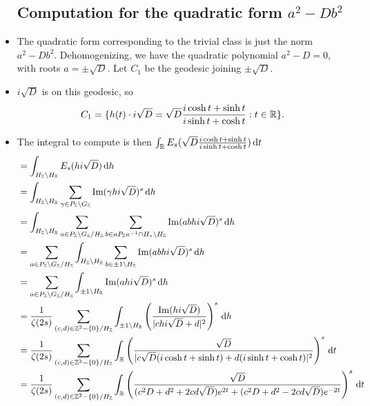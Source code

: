 \documentclass[11pt]{amsart}
\newcommand{\sm}{\setminus}
\begin{document}
\begin{itemize}
	\subsection{Computation for the quadratic form $a^{2}-Db^{2}$}
		\item The quadratic form corresponding to the trivial class is just the norm $a^{2}-Db^{2}$. Dehomogenizing, we have the quadratic polynomial $a^{2}-D=0$, with roots $a=\pm \sqrt{D}$. Let $C_{1}$ be the geodesic joining $\pm \sqrt{D}$.
		\item $i\sqrt{D}$ is on this geodesic, so
			\begin{align*}
				C_{1}= \{ h(t)\cdot i\sqrt{D} = \sqrt{D}\frac{i \cosh t+ \sinh t}{i \sinh t+\cosh t}: t\in \mathbb{R}\}. 
			\end{align*} 
		\item The integral to compute is then $\int_{\mathbb{R}} E_{s}(\sqrt{D}\frac{i \cosh t+ \sinh t}{i \sinh t+\cosh t}) \,{\rm d} t $
			\begin{align*}
																	&= \int_{H_{\Z}\sm H_{\R}} E_{s}(h  i \sqrt{D}) \dop h \\
																	&= \int_{H_{\Z}\sm H_{\R}} \sum_{\gamma \in P_{\Z}\sm G_{\Z}}\im(\gamma h i \sqrt{D})^{s}\dop h \\
																	&= \int_{H_{\Z}\sm H_{\R}} \sum_{a \in P_{\Z}\sm G_{\Z}/H_{\Z}} \sum_{b \in a P_{\Z} a^{-1} \cap H_{z} \sm H_{\Z}} \im(ab h i\sqrt{D})^{s}\dop h  \\
																	&=\sum_{a \in P_{\Z}\sm G_{\Z}/H_{\Z}}  \int_{H_{\Z}\sm H_{\R}} \sum_{b \in \pm 1 \sm H_{\Z}} \im(ab h i\sqrt{D})^{s}\dop h  \\
																	&=\sum_{a \in P_{\Z}\sm G_{\Z}/H_{\Z}}  \int_{\pm 1 \sm H_{\R}}  \im(a h i\sqrt{D})^{s}\dop h  \\
																	&=\frac{1}{\zeta(2s)} \sum_{(c,d)\in \Z^{2}- \{0\}/H_{\Z}}  \int_{\pm 1 \sm H_{\R}}  \left(\frac{\im(h i \sqrt{D})}{|c h i \sqrt{D} +d|^{2}}\right)^{s}\dop h \\
																	&=\frac{1}{\zeta(2s)} \sum_{(c,d)\in \Z^{2}- \{0\}/H_{\Z}}  \int_{\R}  \left(\frac{\sqrt{D}}{|c  \sqrt{D} (i\cosh t +\sinh t) +d(i \sinh t + \cosh t)|^{2}}\right)^{s}\dop t\\ 
																	&=\frac{1}{\zeta(2s)} \sum_{(c,d)\in \Z^{2}- \{0\}/H_{\Z}}  \int_{\R}  \left(\frac{\sqrt{D}}{(c^{2}D+d^{2}+2cd \sqrt{D}) e^{2t}+(c^{2}D+d^{2}-2cd \sqrt{D})e^{-2t}}\right)^{s}\dop t 
			\end{align*}
\end{itemize}
\end{document}
